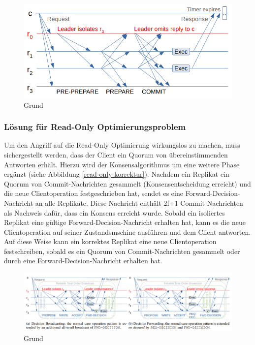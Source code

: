 \documentclass[nonacm,sigconf,natbib=false]{acmart}
\begin{document}
\begin{figure}
  \centering
  \includegraphics[width=\linewidth]{read-only-problem.png}
  \caption{Grund}
  \label{fig:read-only-problem}
\end{figure}

\subsubsection{Lösung für Read-Only Optimierungsproblem}

Um den Angriff auf die Read-Only Optimierung wirkungslos zu machen, muss sichergestellt werden, dass der Client ein Quorum von übereinstimmenden Antworten erhält. Hierzu wird der Konsensalgorithmus um eine weitere Phase ergänzt (siehe Abbildung \ref{read-only-korrektur}). Nachdem ein Replikat ein Quorum von Commit-Nachrichten gesammelt (Konsensentscheidung erreicht) und die neue Clientoperation festgeschrieben hat, sendet es eine Forward-Decision-Nachricht an alle Replikate. Diese Nachricht enthält 2f+1 Commit-Nachrichten als Nachweis dafür, dass ein Konsens erreicht wurde. Sobald ein isoliertes Replikat eine gültige Forward-Decision-Nachricht erhalten hat, kann es die neue Clientoperation auf seiner Zustandsmschine ausführen und dem Client antworten. Auf diese Weise kann ein korrektes Replikat eine neue Clientoperation festschreiben, sobald es ein Quorum von Commit-Nachrichten gesammelt oder durch eine Forward-Decision-Nachricht erhalten hat.

\begin{figure}
  \centering
  \includegraphics[width=\linewidth]{read-only-korrektur.png}
  \caption{Grund}
  \label{fig:read-only-korrektur}
\end{figure}
\end{document}
